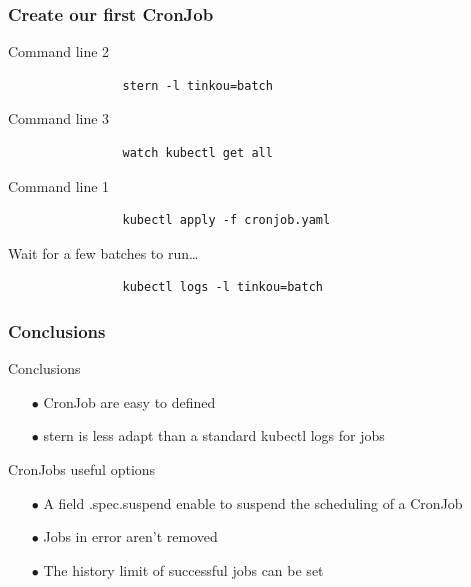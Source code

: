 	\begin{frame}[fragile]
		\frametitle{Create our first CronJob}
		
		\begin{block}{Command line 2}
			\begin{verbatim}
				stern -l tinkou=batch
			\end{verbatim}
		\end{block}
		
		\begin{block}{Command line 3}
			\begin{verbatim}
				watch kubectl get all
			\end{verbatim}
		\end{block}
		
		\begin{block}{Command line 1}
			\begin{verbatim}
				kubectl apply -f cronjob.yaml
			\end{verbatim}
			Wait for a few batches to run…
			\begin{verbatim}
				kubectl logs -l tinkou=batch
			\end{verbatim}
		\end{block}
	\end{frame}

	\begin{frame}
		\frametitle{Conclusions}
		
		\begin{block}{Conclusions}
			\begin{itemize}
				\item[$\bullet$] CronJob are easy to defined
				\item[$\bullet$] stern is less adapt than a standard kubectl logs for jobs
			\end{itemize}
		\end{block}
		
		\begin{block}{CronJobs useful options}
			\begin{itemize}
				\item[$\bullet$] A field .spec.suspend enable to suspend the scheduling of a CronJob
				\item[$\bullet$] Jobs in error aren't removed
				\item[$\bullet$] The history limit of successful jobs can be set
			\end{itemize}
		
		\end{block}
	\end{frame}
	
